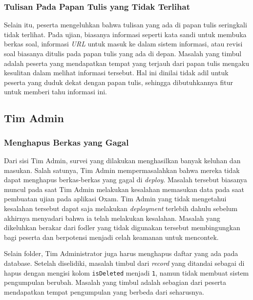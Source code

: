     \subsubsection{Tulisan Pada Papan Tulis yang Tidak Terlihat}\label{ref-prob-peserta-papan-tulis}
    Selain itu, peserta mengeluhkan bahwa tulisan yang ada di papan tulis seringkali tidak terlihat. Pada ujian, biasanya informasi seperti kata sandi untuk membuka berkas soal, informasi \textit{URL} untuk masuk ke dalam sistem informasi, atau revisi soal biasanya ditulis pada papan tulis yang ada di depan. Masalah yang timbul adalah peserta yang mendapatkan tempat yang terjauh dari papan tulis mengaku kesulitan dalam melihat informasi tersebut. Hal ini dinilai tidak adil untuk peserta yang duduk dekat dengan papan tulis, sehingga dibutuhkannya fitur untuk memberi tahu informasi ini.

\subsection{Tim Admin}
    \subsubsection{Menghapus Berkas yang Gagal}\label{ref-prob-admin-berkas-gagal}
    Dari sisi Tim Admin, survei yang dilakukan menghasilkan banyak keluhan dan masukan. Salah satunya, Tim Admin mempermasalahkan bahwa mereka tidak dapat menghapus berkas-berkas yang gagal di \textit{deploy}. Masalah tersebut biasanya muncul pada saat Tim Admin melakukan kesalahan memasukan data pada saat pembuatan ujian pada aplikasi Oxam. Tim Admin yang tidak mengetahui kesalahan tersebut dapat saja melakukan \textit{deployment} terlebih dahulu sebelum akhirnya menyadari bahwa ia telah melakukan kesalahan. Masalah yang dikeluhkan berakar dari fodler yang tidak digunakan tersebut membingungkan bagi peserta dan berpotensi menjadi celah keamanan untuk mencontek.

    Selain folder, Tim Administrator juga harus menghapus daftar yang ada pada database. Setelah diselidiki, masalah timbul dari \textit{record} yang ditandai sebagai di hapus dengan mengisi kolom \texttt{isDeleted} menjadi \texttt{1}, namun tidak membuat sistem pengumpulan berubah. Masalah yang timbul adalah sebagian dari peserta mendapatkan tempat pengumpulan yang berbeda dari seharusnya.

